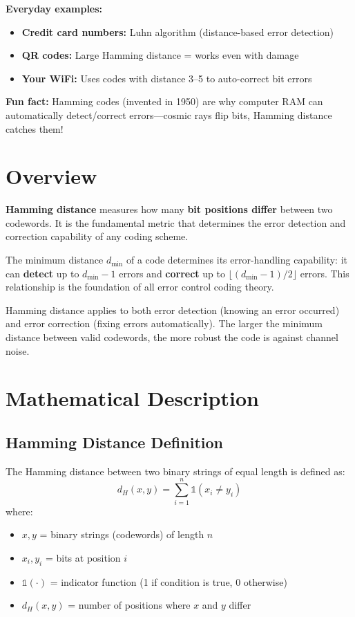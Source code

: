 \begin{nontechnical}
\textbf{Everyday examples:}
\begin{itemize}
\item \textbf{Credit card numbers:} Luhn algorithm (distance-based error detection)
\item \textbf{QR codes:} Large Hamming distance = works even with damage
\item \textbf{Your WiFi:} Uses codes with distance 3--5 to auto-correct bit errors
\end{itemize}

\textbf{Fun fact:} Hamming codes (invented in 1950) are why computer RAM can automatically detect/correct errors---cosmic rays flip bits, Hamming distance catches them!
\end{nontechnical}

\section{Overview}

\textbf{Hamming distance} measures how many \textbf{bit positions differ} between two codewords. It is the fundamental metric that determines the error detection and correction capability of any coding scheme.

\begin{keyconcept}
The minimum distance $d_{\min}$ of a code determines its error-handling capability: it can \textbf{detect} up to $d_{\min} - 1$ errors and \textbf{correct} up to $\lfloor(d_{\min} - 1)/2\rfloor$ errors. This relationship is the foundation of all error control coding theory.
\end{keyconcept}

Hamming distance applies to both error detection (knowing an error occurred) and error correction (fixing errors automatically). The larger the minimum distance between valid codewords, the more robust the code is against channel noise.

\section{Mathematical Description}

\subsection{Hamming Distance Definition}

The Hamming distance between two binary strings of equal length is defined as:
\begin{equation}
d_H(x, y) = \sum_{i=1}^{n} \mathbb{1}(x_i \neq y_i)
\label{eq:hamming-distance}
\end{equation}
where:
\begin{itemize}
\item $x, y$ = binary strings (codewords) of length $n$
\item $x_i, y_i$ = bits at position $i$
\item $\mathbb{1}(\cdot)$ = indicator function (1 if condition is true, 0 otherwise)
\item $d_H(x,y)$ = number of positions where $x$ and $y$ differ
\end{itemize}

